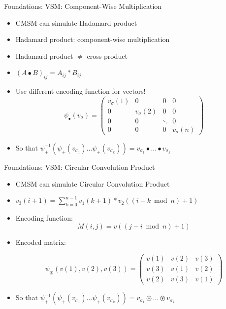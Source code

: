 \documentclass[12pt,a4paper]{beamer}
\begin{document}
\begin{frame}{Foundations: VSM: Component-Wise Multiplication}
\begin{itemize}
\item CMSM can simulate Hadamard product
\item Hadamard product: component-wise multiplication
\item Hadamard product $\neq$ cross-product
\item $(A \bullet B)_{ij} = A_{ij} * B_{ij}$
\item Use different encoding function for vectors!
$$  \psi_{\bullet}(v_{\sigma}) =
\left( \begin{array}{cccc}
v_{\sigma}(1) & 0 & 0 & 0 \\
0 & v_{\sigma}(2) & 0 & 0 \\
0 & 0 & \ddots & 0 \\
0 & 0 & 0 & v_{\sigma}(n) \end{array} \right) $$

\item So that $\psi_{+}^{-1} (\psi_{+}(v_{\sigma_{1}}) \ldots \psi_{+}(v_{\sigma_{k}})) = v_{\sigma_{1}} \bullet \ldots \bullet v_{\sigma_{k}}$


\end{itemize}
\end{frame}




\begin{frame}{Foundations: VSM: Circular Convolution Product}
\begin{itemize}
\item CMSM can simulate Circular Convolution Product 
\item $v_{3}(i+1) = \sum_{k=0}^{n-1}{v_{1} (k+1) * v_{2} ( (i-k \bmod{n}) +1) }$
\item Encoding function:
$$  M(i,j) = v ((j - i \bmod{n} ) +1) $$
\item Encoded matrix:

$$\psi_{ \circledast } ( v(1), v(2), v(3) ) =
\left( \begin{array}{ccc}
v(1) & v(2) & v(3)  \\
v(3) & v(1) & v(2)  \\
v(2) & v(3) & v(1)  \end{array} \right)
$$

\item So that $\psi_{+}^{-1} (\psi_{+}(v_{\sigma_{1}}) \ldots \psi_{+}(v_{\sigma_{k}})) = v_{\sigma_{1}} \circledast \ldots \circledast v_{\sigma_{k}}$

\end{itemize}
\end{frame}
\end{document}
